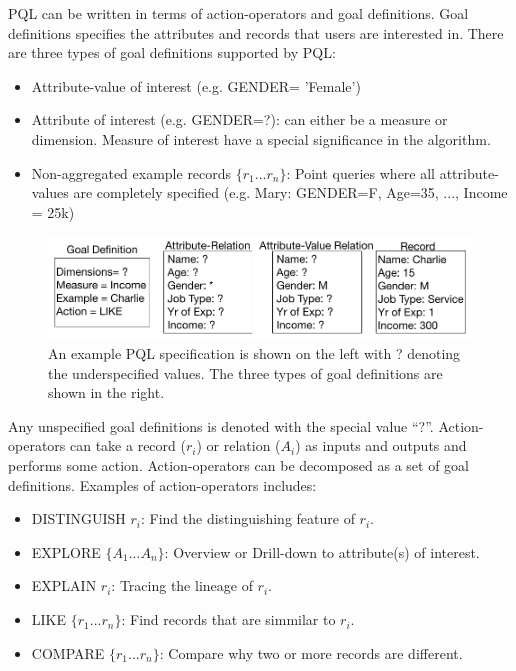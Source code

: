 \documentclass{sig-alternate-05-2015}
\begin{document}
\begin{enumerate}
\end{enumerate}
PQL can be written in terms of action-operators and goal definitions. Goal definitions specifies the attributes and records that users are interested in. There are three types of goal definitions supported by PQL: 
\begin{itemize}
	\item Attribute-value of interest (e.g. GENDER= 'Female')
	\item Attribute of interest (e.g. GENDER=?): can either be a measure or dimension. Measure of interest have a special significance in the algorithm.
	\item Non-aggregated example records $\{r_1 ...r_n\}$: Point queries where all attribute-values are completely specified (e.g. Mary: GENDER=F, Age=35, ..., Income = 25k)
\end{itemize}
\begin{figure}[ht!]\label{nodeType}
\includegraphics[width=\linewidth]{figures/nodeTypes.png}
\caption{An example PQL specification is shown on the left with ? denoting the underspecified values. The three types of goal definitions are shown in the right.}
\end{figure}
Any unspecified goal definitions is denoted with the special value ``?''. Action-operators can take a record ($r_i$) or relation ($A_i$) as inputs and outputs and performs some action. Action-operators can be decomposed as a set of goal definitions. Examples of action-operators includes:   
\begin{itemize}
  \item DISTINGUISH $r_i$: Find the distinguishing feature of $r_i$.
	\item EXPLORE $\{A_1 ...A_n\}$: Overview or Drill-down to attribute(s) of interest.
	\item EXPLAIN $r_i$: Tracing the lineage of $r_i$.
	\item LIKE $\{r_1 ...r_n\}$: Find records that are simmilar to $r_i$.
	\item COMPARE $\{r_1 ...r_n\}$: Compare why two or more records are different.
\end{itemize}
\end{document}
